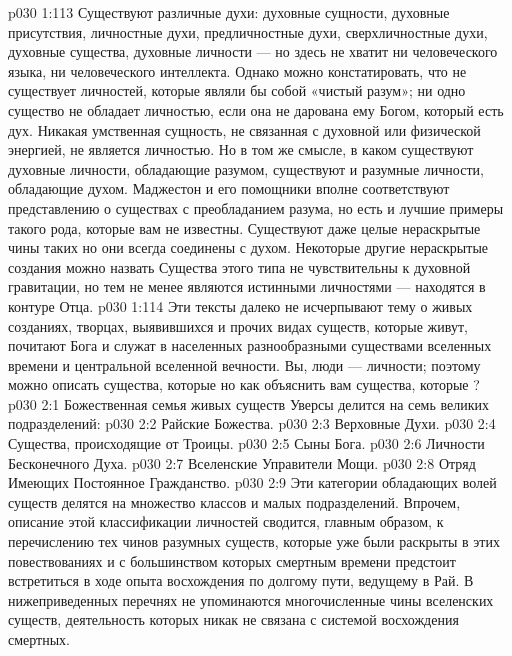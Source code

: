 \vs p030 1:113 Существуют различные духи: духовные сущности, духовные присутствия, личностные духи, предличностные духи, сверхличностные духи, духовные существа, духовные личности --- но здесь не хватит ни человеческого языка, ни человеческого интеллекта. Однако можно констатировать, что не существует личностей, которые являли бы собой «чистый разум»; ни одно существо не обладает личностью, если она не дарована ему Богом, который есть дух. Никакая умственная сущность, не связанная с духовной или физической энергией, не является личностью. Но в том же смысле, в каком существуют духовные личности, обладающие разумом, существуют и разумные личности, обладающие духом. Маджестон и его помощники вполне соответствуют представлению о существах с преобладанием разума, но есть и лучшие примеры такого рода, которые вам не известны. Существуют даже целые нераскрытые чины таких  но они всегда соединены с духом. Некоторые другие нераскрытые создания можно назвать  Существа этого типа не чувствительны к духовной гравитации, но тем не менее являются истинными личностями --- находятся в контуре Отца.
\vs p030 1:114 \pc Эти тексты далеко не исчерпывают тему о живых созданиях, творцах, выявившихся и прочих видах существ, которые живут, почитают Бога и служат в населенных разнообразными существами вселенных времени и центральной вселенной вечности. Вы, люди --- личности; поэтому можно описать существа, которые  но как объяснить вам существа, которые ?
\vs p030 2:1 Божественная семья живых существ Уверсы делится на семь великих подразделений:
\vs p030 2:2 \bibnobreakspace Райские Божества.
\vs p030 2:3 \bibnobreakspace Верховные Духи.
\vs p030 2:4 \bibnobreakspace Существа, происходящие от Троицы.
\vs p030 2:5 \bibnobreakspace Сыны Бога.
\vs p030 2:6 \bibnobreakspace Личности Бесконечного Духа.
\vs p030 2:7 \bibnobreakspace Вселенские Управители Мощи.
\vs p030 2:8 \bibnobreakspace Отряд Имеющих Постоянное Гражданство.
\vs p030 2:9 \pc Эти категории обладающих волей существ делятся на множество классов и малых подразделений. Впрочем, описание этой классификации личностей сводится, главным образом, к перечислению тех чинов разумных существ, которые уже были раскрыты в этих повествованиях и с большинством которых смертным времени предстоит встретиться в ходе опыта восхождения по долгому пути, ведущему в Рай. В нижеприведенных перечнях не упоминаются многочисленные чины вселенских существ, деятельность которых никак не связана с системой восхождения смертных.
